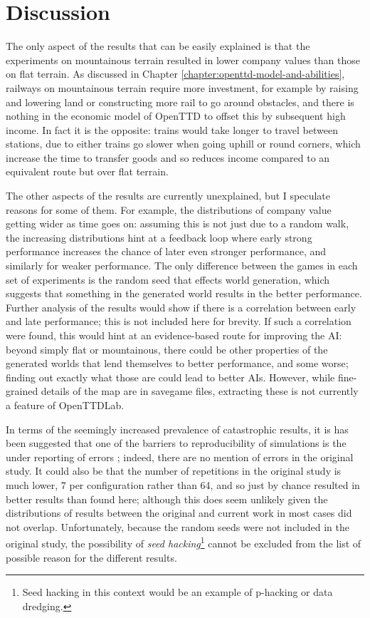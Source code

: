 \documentclass[logo,msc,dsti]{style/infthesis}    %
\newcommand{\singlespacedfootnote}[1]{{\singlespace\footnote{#1}}}
\begin{document}
{\section{Discussion}

The only aspect of the results that can be easily explained is that the experiments on mountainous terrain resulted in lower company values than those on flat terrain. As discussed in Chapter \ref{chapter:openttd-model-and-abilities}, railways on mountainous terrain require more investment, for example by raising and lowering land or constructing more rail to go around obstacles, and there is nothing in the economic model of OpenTTD to offset this by subsequent high income. In fact it is the opposite: trains would take longer to travel between stations, due to either trains go slower when going uphill or round corners, which increase the time to transfer goods and so reduces income compared to an equivalent route but over flat terrain.

The other aspects of the results are currently unexplained, but I speculate reasons for some of them. For example, the distributions of company value getting wider as time goes on: assuming this is not just due to a random walk, the increasing distributions hint at a feedback loop where early strong performance increases the chance of later even stronger performance, and similarly for weaker performance. The only difference between the games in each set of experiments is the random seed that effects world generation, which suggests that something in the generated world results in the better performance. Further analysis of the results would show if there is a correlation between early and late performance; this is not included here for brevity. If such a correlation were found, this would hint at an evidence-based route for improving the AI: beyond simply flat or mountainous, there could be other properties of the generated worlds that lend themselves to better performance, and some worse; finding out exactly what those are could lead to better AIs. However, while fine-grained details of the map are in savegame files, extracting these is not currently a feature of OpenTTDLab.

In terms of the seemingly increased prevalence of catastrophic results, it is has been suggested that one of the barriers to reproducibility of simulations is the under reporting of errors \cite{luijken2024replicability}; indeed, there are no mention of errors in the original study. It could also be that the number of repetitions in the original study is much lower, 7 per configuration rather than 64, and so just by chance resulted in better results than found here; although this does seem unlikely given the distributions of results between the original and current work in most cases did not overlap. Unfortunately, because the random seeds were not included in the original study, the possibility of \emph{seed hacking}\singlespacedfootnote{Seed hacking in this context would be an example of p-hacking or data dredging.} cannot be excluded from the list of possible reason for the different results.

}
\end{document}
